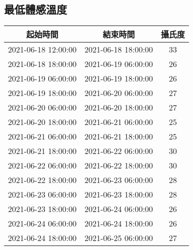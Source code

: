 \documentclass{article}%
\begin{document}
\begin{center}
%
\section{最低體感溫度}%
\label{sec:}%
\begin{tabular}{|c|c|c|}%
\hline%
起始時間&結束時間&攝氏度\\%
\hline%
2021{-}06{-}18 12:00:00&2021{-}06{-}18 18:00:00&33\\%
\hline%
2021{-}06{-}18 18:00:00&2021{-}06{-}19 06:00:00&26\\%
\hline%
2021{-}06{-}19 06:00:00&2021{-}06{-}19 18:00:00&26\\%
\hline%
2021{-}06{-}19 18:00:00&2021{-}06{-}20 06:00:00&27\\%
\hline%
2021{-}06{-}20 06:00:00&2021{-}06{-}20 18:00:00&27\\%
\hline%
2021{-}06{-}20 18:00:00&2021{-}06{-}21 06:00:00&25\\%
\hline%
2021{-}06{-}21 06:00:00&2021{-}06{-}21 18:00:00&25\\%
\hline%
2021{-}06{-}21 18:00:00&2021{-}06{-}22 06:00:00&30\\%
\hline%
2021{-}06{-}22 06:00:00&2021{-}06{-}22 18:00:00&30\\%
\hline%
2021{-}06{-}22 18:00:00&2021{-}06{-}23 06:00:00&28\\%
\hline%
2021{-}06{-}23 06:00:00&2021{-}06{-}23 18:00:00&28\\%
\hline%
2021{-}06{-}23 18:00:00&2021{-}06{-}24 06:00:00&26\\%
\hline%
2021{-}06{-}24 06:00:00&2021{-}06{-}24 18:00:00&26\\%
\hline%
2021{-}06{-}24 18:00:00&2021{-}06{-}25 06:00:00&27\\%
\hline%
\end{tabular}

%

\end{center}
\end{document}
